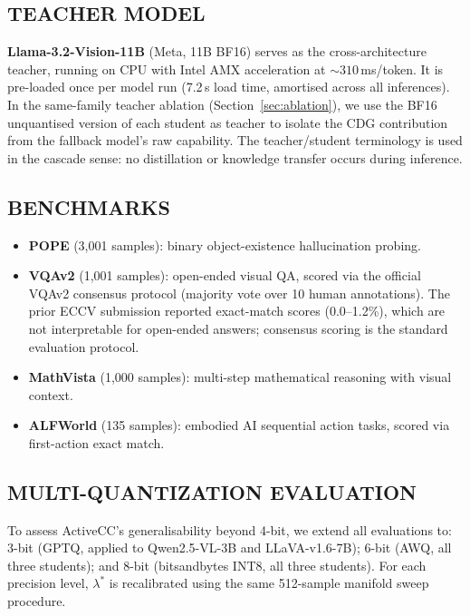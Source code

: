 \documentclass{ieeetmlcn}
\begin{document}
\subsection{TEACHER MODEL}
\textbf{Llama-3.2-Vision-11B} (Meta, 11B BF16) serves as the cross-architecture teacher, running on CPU with Intel AMX acceleration at $\sim\!310$\,ms/token. It is pre-loaded once per model run (7.2\,s load time, amortised across all inferences). In the same-family teacher ablation (Section~\ref{sec:ablation}), we use the BF16 unquantised version of each student as teacher to isolate the CDG contribution from the fallback model's raw capability. The teacher/student terminology is used in the cascade sense: no distillation or knowledge transfer occurs during inference.

\subsection{BENCHMARKS}
\begin{itemize}
  \item \textbf{POPE} \cite{li2023pope} (3,001 samples): binary
        object-existence hallucination probing.
  \item \textbf{VQAv2} \cite{balanced_vqa_v2} (1,001 samples): open-ended
        visual QA, scored via the official VQAv2 consensus protocol
        (majority vote over 10 human annotations). The prior ECCV
        submission reported exact-match scores (0.0--1.2\%), which are
        not interpretable for open-ended answers; consensus scoring is
        the standard evaluation protocol.
  \item \textbf{MathVista} \cite{lu2024mathvista} (1,000 samples):
        multi-step mathematical reasoning with visual context.
  \item \textbf{ALFWorld} \cite{shridhar2020alfworld} (135 samples):
        embodied AI sequential action tasks, scored via first-action
        exact match.
\end{itemize}

\subsection{MULTI-QUANTIZATION EVALUATION}
To assess ActiveCC's generalisability beyond 4-bit, we extend all
evaluations to: 3-bit (GPTQ, applied to Qwen2.5-VL-3B and
LLaVA-v1.6-7B); 6-bit (AWQ, all three students); and 8-bit
(bitsandbytes INT8, all three students). For each precision level,
$\lambda^*$ is recalibrated using the same 512-sample manifold sweep
procedure.
\end{document}
